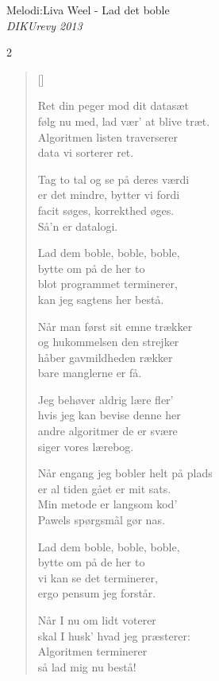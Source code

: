 {Melodi:Liva Weel - Lad det boble}\\[.2em]
{\small\itshape DIKUrevy 2013}
\begin{multicols}2
\settowidth{\versewidth}{Når engang jeg bobler helt på plads}
\begin{verse}[\versewidth]

Ret din peger mod dit datasæt\\
følg nu med, lad vær' at blive træt.\\
Algoritmen listen traverserer\\
data vi sorterer ret.

Tag to tal og se på deres værdi\\
er det mindre, bytter vi fordi\\
facit søges, korrekthed øges.\\
Så'n er datalogi.

Lad dem boble, boble, boble,\\
bytte om på de her to\\
blot programmet terminerer,\\
kan jeg sagtens her bestå.

Når man først sit emne trækker\\
og hukommelsen den strejker\\
håber gavmildheden rækker\\
bare manglerne er få.

Jeg behøver aldrig lære fler'\\
hvis jeg kan bevise denne her\\
andre algoritmer de er svære\\
siger vores lærebog.

Når engang jeg bobler helt på plads\\
er al tiden gået er mit sats.\\
Min metode er langsom kod'\\
Pawels spørgsmål gør nas.

Lad dem boble, boble, boble,\\
bytte om på de her to\\
vi kan se det terminerer,\\
ergo pensum jeg forstår.

Når I nu om lidt voterer\\
skal I husk' hvad jeg præsterer:\\
Algoritmen terminerer\\
så lad mig nu bestå!

\end{verse}
\end{multicols}

